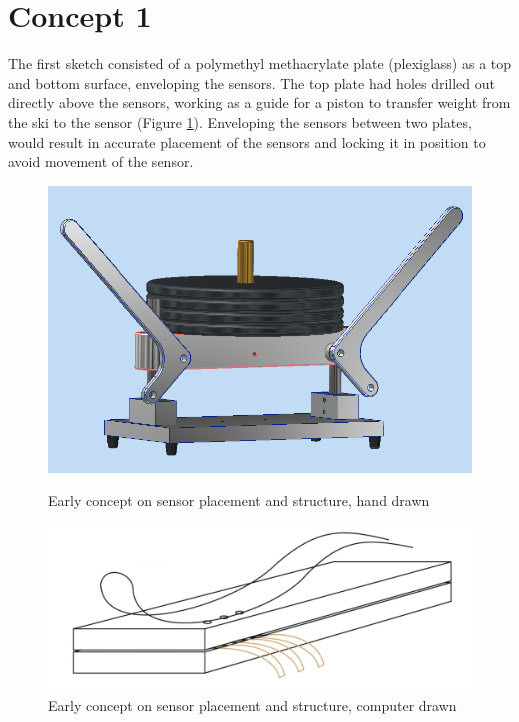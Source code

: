 \section{Concept 1}
\label{sec:concept1}
The first sketch consisted of a polymethyl methacrylate plate (plexiglass) as a top and bottom surface, enveloping the sensors. The top plate had holes drilled out directly above the sensors, working as a guide for a piston to transfer weight from the ski to the sensor (Figure \ref{fig:earlyconcept}). Enveloping the sensors between two plates, would result in accurate placement of the sensors and locking it in position to avoid movement of the sensor.

\begin{figure}[!htb]
   \begin{minipage}{0.44\textwidth}
     \centering
     \includegraphics[width=0.9\linewidth]{figures/linearpress2.png}
     \caption{Early concept on sensor placement and structure, hand drawn}
     \label{fig:drawnconcept}
   \end{minipage}\hfill
   \begin{minipage}{0.44\textwidth}
     \centering
     \includegraphics[width=0.9\linewidth]{figures/earlyconcept.png}
     \caption{Early concept on sensor placement and structure, computer drawn}
    \label{fig:earlyconcept}
   \end{minipage}
\end{figure}

